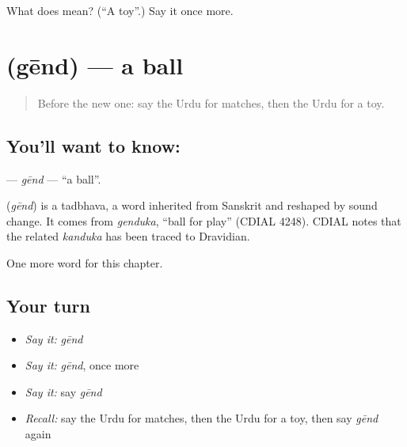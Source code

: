 \begin{tcolorbox}[breakable,colback=teal!4,colframe=teal!35!black,title={Before you move on}]
What does  mean? (\textquotedblleft{}A toy\textquotedblright{}.) Say it once more.
\end{tcolorbox}
\section[\texorpdfstring{\ur{گیند} (gēnd)}{گیند (gēnd)}]{ (gēnd) — a ball}

\label{lesson:UR-C112-gend}



\begin{quote}
Before the new one: say the Urdu for matches, then the Urdu for a toy.
\end{quote}

\subsection*{You'll want to know: }
\textbf{} — \emph{gēnd} — \textquotedblleft{}a ball\textquotedblright{}.

\begin{cousinweb}
\textbf{} (\emph{gēnd}) is a tadbhava, a word inherited from Sanskrit and reshaped by sound change. It comes from \emph{genduka}, \textquotedblleft{}ball for play\textquotedblright{} (CDIAL 4248). CDIAL notes that the related \emph{kanduka} has been traced to Dravidian.
\end{cousinweb}

\begin{grammarlens}[title={What you've built}]
One more word for this chapter.
\end{grammarlens}

\subsection*{Your turn}
\begin{itemize}
\raggedright
  \item \emph{Say it:} \emph{gēnd}
  \item \emph{Say it:} \emph{gēnd}, once more
  \item \emph{Say it:} say \emph{gēnd}
  \item \emph{Recall:} say the Urdu for matches, then the Urdu for a toy, then say \emph{gēnd} again
\end{itemize}

